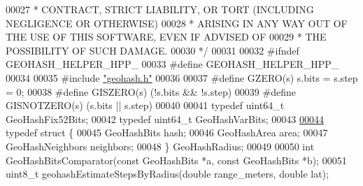 \begin{DoxyCode}
00027 \textcolor{comment}{ * CONTRACT, STRICT LIABILITY, OR TORT (INCLUDING NEGLIGENCE OR OTHERWISE)}
00028 \textcolor{comment}{ * ARISING IN ANY WAY OUT OF THE USE OF THIS SOFTWARE, EVEN IF ADVISED OF}
00029 \textcolor{comment}{ * THE POSSIBILITY OF SUCH DAMAGE.}
00030 \textcolor{comment}{ */}
00031 
00032 \textcolor{preprocessor}{#}\textcolor{preprocessor}{ifndef} \textcolor{preprocessor}{GEOHASH\_HELPER\_HPP\_}
00033 \textcolor{preprocessor}{#}\textcolor{preprocessor}{define} \textcolor{preprocessor}{GEOHASH\_HELPER\_HPP\_}
00034 
00035 \textcolor{preprocessor}{#}\textcolor{preprocessor}{include} \hyperlink{geohash_8h}{"geohash.h"}
00036 
00037 \textcolor{preprocessor}{#}\textcolor{preprocessor}{define} \textcolor{preprocessor}{GZERO}\textcolor{preprocessor}{(}\textcolor{preprocessor}{s}\textcolor{preprocessor}{)} \textcolor{preprocessor}{s}\textcolor{preprocessor}{.}\textcolor{preprocessor}{bits} \textcolor{preprocessor}{=} \textcolor{preprocessor}{s}\textcolor{preprocessor}{.}\textcolor{preprocessor}{step} \textcolor{preprocessor}{=} 0\textcolor{preprocessor}{;}
00038 \textcolor{preprocessor}{#}\textcolor{preprocessor}{define} \textcolor{preprocessor}{GISZERO}\textcolor{preprocessor}{(}\textcolor{preprocessor}{s}\textcolor{preprocessor}{)} \textcolor{preprocessor}{(}\textcolor{preprocessor}{!}\textcolor{preprocessor}{s}\textcolor{preprocessor}{.}\textcolor{preprocessor}{bits} \textcolor{preprocessor}{&&} \textcolor{preprocessor}{!}\textcolor{preprocessor}{s}\textcolor{preprocessor}{.}\textcolor{preprocessor}{step}\textcolor{preprocessor}{)}
00039 \textcolor{preprocessor}{#}\textcolor{preprocessor}{define} \textcolor{preprocessor}{GISNOTZERO}\textcolor{preprocessor}{(}\textcolor{preprocessor}{s}\textcolor{preprocessor}{)} \textcolor{preprocessor}{(}\textcolor{preprocessor}{s}\textcolor{preprocessor}{.}\textcolor{preprocessor}{bits} \textcolor{preprocessor}{||} \textcolor{preprocessor}{s}\textcolor{preprocessor}{.}\textcolor{preprocessor}{step}\textcolor{preprocessor}{)}
00040 
00041 \textcolor{keyword}{typedef} uint64\_t GeoHashFix52Bits;
00042 \textcolor{keyword}{typedef} uint64\_t GeoHashVarBits;
00043 
\hyperlink{structGeoHashRadius}{00044} \textcolor{keyword}{typedef} \textcolor{keyword}{struct} \{
00045     GeoHashBits hash;
00046     GeoHashArea area;
00047     GeoHashNeighbors neighbors;
00048 \} GeoHashRadius;
00049 
00050 \textcolor{keywordtype}{int} GeoHashBitsComparator(\textcolor{keyword}{const} GeoHashBits *a, \textcolor{keyword}{const} GeoHashBits *b);
00051 uint8\_t geohashEstimateStepsByRadius(\textcolor{keywordtype}{double} range\_meters, \textcolor{keywordtype}{double} lat);

\end{DoxyCode}
